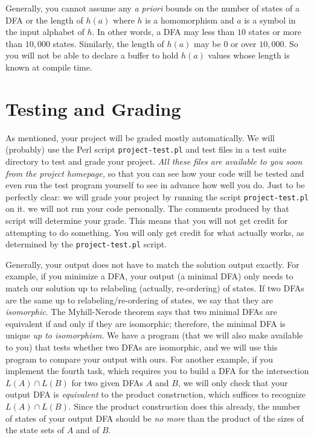 Generally, you cannot assume any \emph{a priori} bounds on the number
of states of a DFA or the length of $h(a)$ where $h$ is a homomorphism
and $a$ is a symbol in the input alphabet of $h$.
In other words, a DFA may less than $10$ states or more
than $10,000$ states.
Similarly, the length of $h(a)$ may be $0$ or over $10,000$.
So you will not be able to declare a buffer to hold $h(a)$ values
whose length is known at compile time.

\section*{Testing and Grading}

As mentioned, your project will be graded mostly automatically.
We will (probably) use the Perl script \texttt{project-test.pl} and test
files in a test suite directory to test and grade your project.
\emph{All these files are available to you soon from the project homepage,}
so that you can see how your code will be tested and even run the test
program yourself to see in advance how well you do.
Just to be perfectly clear: we will grade your project by running
the script \texttt{project-test.pl} on it.
we will not run your code personally.
The comments produced by that script will determine your grade.
This means that you will not get credit for attempting to do something.
You will only get credit for what actually works, as determined by
the \texttt{project-test.pl} script.

Generally, your output does not have to match the solution output exactly.
For example, if you minimize a DFA, your output (a minimal DFA) only needs
to match our solution up to relabeling (actually, re-ordering) of states.
If two DFAs are the same up to relabeling/re-ordering of states, we say that
they are \emph{isomorphic}.
The Myhill-Nerode theorem says that two minimal DFAs are equivalent if
and only if they are isomorphic; therefore, the minimal DFA is
unique \emph{up to isomorphism}.
We have a program (that we will also make available to you) that tests
whether two DFAs are isomorphic, and we will use this program to compare
your output with ours.
For another example, if you implement the fourth task, which requires
you to build a DFA for the intersection $L(A)\cap L(B)$ for two given
DFAs $A$ and $B$, we will only check that your output DFA is
\emph{equivalent} to the product construction, which suffices to
recognize $L(A)\cap L(B)$.
Since the product construction does this already, the number of states
of your output DFA should be \emph{no more} than the product of the
sizes of the state sets of $A$ and of $B$.

